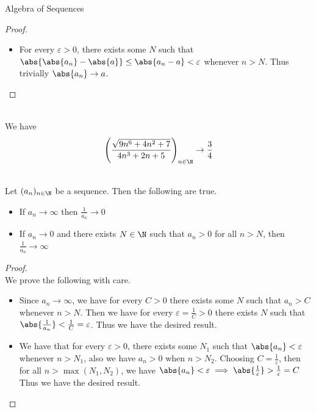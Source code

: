 \documentclass[a4paper]{article}
\begin{document}
\begin{prp}{Algebra of Sequences}{}
\begin{proof}
\begin{itemize}
\begin{align*}
\frac{b^2}{2}<\abs{bb_n}&\implies\frac{1}{\abs{bb_n}}<\frac{2}{b^2} \\
&\implies\abs{\frac{b_n-b}{bb_n}}<\frac{2\abs{b_n-b}}{b^2} \\
&\implies\abs{\frac{1}{b_n}-\frac{1}{b}}<\frac{2\abs{b_n-b}}{b^2}
\end{align*}
Since we have $0<\abs{\frac{1}{b_n}-\frac{1}{b}}<\frac{2\abs{b_n-b}}{b^2}$ then by sandwich theorem, we have that $\frac{1}{b_n}\to\frac{1}{b}$. Then by product rule, we have the desired result. 
\item For every $\varepsilon>0$, there exists some $N$ such that $\abs{\abs{a_n}-\abs{a}}\leq\abs{a_n-a}<\varepsilon$ whenever $n>N$. Thus trivially $\abs{a_n}\to a$. 
\end{itemize}
\end{proof}
\end{prp}

\begin{eg}{}{}\\
We have $$\left(\frac{\sqrt{9n^6+4n^2+7}}{4n^3+2n+5}\right)_{n\in\N}\to\frac{3}{4}$$
\end{eg}

\begin{prp}{}{}\\
Let $(a_n)_{n\in\N}$ be a sequence. Then the following are true. 
\begin{itemize}
\item If $a_n\to\infty$ then $\frac{1}{a_n}\to 0$
\item If $a_n\to 0$ and there exists $N\in\N$ such that $a_n>0$ for all $n>N$, then $\frac{1}{a_n}\to\infty$
\end{itemize}
\begin{proof}\\ We prove the following with care. 
\begin{itemize}
\item Since $a_n\to\infty$, we have for every $C>0$ there exists some $N$ such that $a_n>C$ whenever $n>N$. Then we have for every $\varepsilon=\frac{1}{C}>0$ there exists $N$ such that $\abs{\frac{1}{a_n}}<\frac{1}{C}=\varepsilon$. Thus we have the desired result. 
\item We have that for every $\varepsilon>0$, there exists some $N_1$ such that $\abs{a_n}<\varepsilon$ whenever $n>N_1$, also we have $a_n>0$ when $n>N_2$. Choosing $C=\frac{1}{\varepsilon}$, then for all $n>\max{(N_1,N_2)}$, we have $\abs{a_n}<\varepsilon\implies\abs{\frac{1}{\varepsilon}}>\frac{1}{\varepsilon}=C$ Thus we have the desired result. 
\end{itemize}
\end{proof}
\end{prp}
\end{document}
